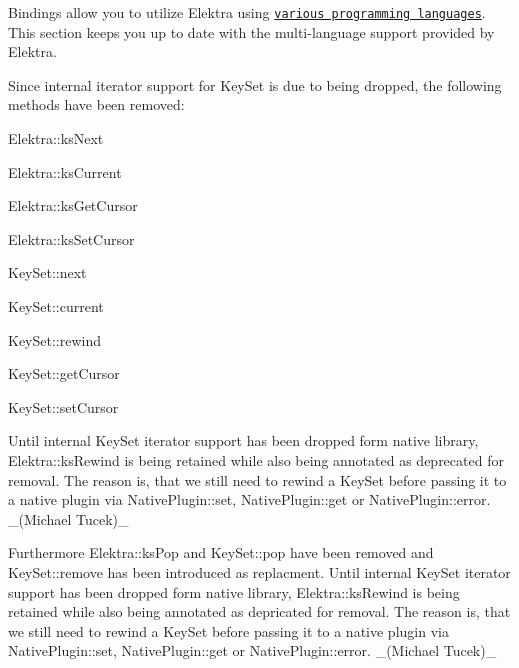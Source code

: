 Bindings allow you to utilize Elektra using \href{https://www.libelektra.org/bindings/readme}{\tt various programming languages}. This section keeps you up to date with the multi-\/language support provided by Elektra.


\begin{DoxyItemize}
\item Since internal iterator support for {\ttfamily Key\+Set} is due to being dropped, the following methods have been removed\+:
\begin{DoxyItemize}
\item {\ttfamily Elektra\+::ks\+Next}
\item {\ttfamily Elektra\+::ks\+Current}
\item {\ttfamily Elektra\+::ks\+Get\+Cursor}
\item {\ttfamily Elektra\+::ks\+Set\+Cursor}
\item {\ttfamily Key\+Set\+::next}
\item {\ttfamily Key\+Set\+::current}
\item {\ttfamily Key\+Set\+::rewind}
\item {\ttfamily Key\+Set\+::get\+Cursor}
\item {\ttfamily Key\+Set\+::set\+Cursor}
\end{DoxyItemize}

Until internal {\ttfamily Key\+Set} iterator support has been dropped form native library, {\ttfamily Elektra\+::ks\+Rewind} is being retained while also being annotated as \textquotesingle{}deprecated for removal\textquotesingle{}. The reason is, that we still need to rewind a {\ttfamily Key\+Set} before passing it to a native plugin via {\ttfamily Native\+Plugin\+::set}, {\ttfamily Native\+Plugin\+::get} or {\ttfamily Native\+Plugin\+::error}. \+\_\+(\+Michael Tucek)\+\_\+

Furthermore {\ttfamily Elektra\+::ks\+Pop} and {\ttfamily Key\+Set\+::pop} have been removed and {\ttfamily Key\+Set\+::remove} has been introduced as replacment. Until internal {\ttfamily Key\+Set} iterator support has been dropped form native library, {\ttfamily Elektra\+::ks\+Rewind} is being retained while also being annotated as \textquotesingle{}depricated for removal\textquotesingle{}. The reason is, that we still need to rewind a {\ttfamily Key\+Set} before passing it to a native plugin via {\ttfamily Native\+Plugin\+::set}, {\ttfamily Native\+Plugin\+::get} or {\ttfamily Native\+Plugin\+::error}. \+\_\+(\+Michael Tucek)\+\_\+


\end{DoxyItemize}
